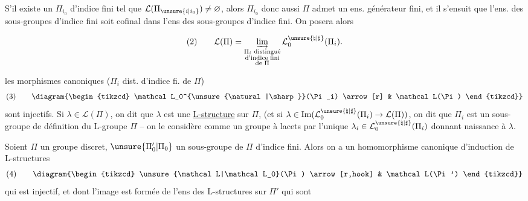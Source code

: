 S'il existe un $\Pi_{i_0}$ d'indice fini tel que
$\mathcal L(\Pi_{\unsure{i|i_0}})\ne\varnothing$, alors $\Pi_{i_0}$ donc aussi $\Pi$ admet
un ens. générateur fini, et il s'ensuit
que l'ens. des sous-groupes  d'indice fini
soit cofinal dans l'ens des sous-groupes
d'indice fini. On posera alors


\[
\text{(2)}\qquad
\mathcal L(\Pi)=
\varinjlim_{\substack{\Pi_i\text{ distingué}\\
\text{d'indice fini}\\
\text{de }\Pi}}
\mathcal L_0^{\unsure{\natural|\sharp}}(\Pi_i).
\]


les morphismes canoniques ($\Pi_i$ dist. d'indice fi.
de $\Pi$)
\[
\text{(3)}\qquad
\diagram{\begin{tikzcd}
\mathcal L_0^{\unsure{\natural|\sharp}}(\Pi_i) \arrow[r] & \mathcal L(\Pi)
\end{tikzcd}}
\]
sont injectifs. Si $\lambda\in\mathcal L(\Pi)$, on dit que
$\lambda$ est une \uline{L-structure} sur $\Pi$,
(et si
$\lambda\in\operatorname{Im}(\mathcal L_0^{\unsure{\natural|\sharp}}(\Pi_i)\to\mathcal L(\Pi))$,
on dit que $\Pi_i$ est
un sous-groupe de définition du L-groupe
$\Pi$ -- on le considère comme un
groupe à lacets par l'unique $\lambda_i\in\mathcal L_0^{\unsure{\natural|\sharp}}(\Pi_i)$
donnant naissance à $\lambda$.

Soient $\Pi$ un groupe discret, $\unsure{\Pi'_0|\Pi_0}$ un
sous-groupe de $\Pi$ d'indice fini. Alors
on a un homomorphisme canonique
d'induction de L-structures
\[
\text{(4)}\qquad
\diagram{\begin{tikzcd}
\unsure{\mathcal L|\mathcal L_0}(\Pi) \arrow[r,hook] & \mathcal L(\Pi')
\end{tikzcd}}
\]
qui est injectif, et dont l'image est formée
de l'ens des L-structures sur $\Pi'$ qui sont

